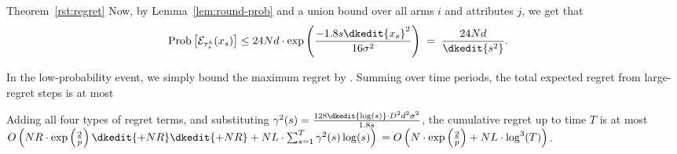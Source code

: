 \begin{emptyextraproof}{Theorem~\ref{rst:regret}}
Now, by Lemma~\ref{lem:round-prob} and a union bound over all arms $i$
and attributes $j$, we get that 
\begin{align*}
\Prob{\AccEU{\tau_s^k}{x_s}}
& \leq 24 \ARMNUM d \cdot \exp \left( \frac{-1.8 s \dkedit{x_s}^2}{16 \sigma^2} \right)
\; = \; \frac{24 \ARMNUM d}{\dkedit{s^2}}.
\end{align*}

In the low-probability event, we simply bound the maximum regret by \MAXR.
Summing over  time periods,
the total expected regret from large-regret steps is at most

Adding all four types of regret terms,
and substituting 
$\EarlyCut[2]{s} = \frac{128 \dkedit{\log(s)} \cdot \Diam^2 d^2 \sigma^2}{1.8 s}$,
the cumulative regret up to time $T$ is at most
$
O \left(\ARMNUM \MAXR \cdot \exp \left( \frac{2}{p} \right)
\dkedit{+ \ARMNUM \MAXR}
\dkedit{+ \ARMNUM \MAXR}
+ \ARMNUM \TieDensity \cdot \sum_{s=1}^{T} \EarlyCut[2]{s} \log(s) \right)\\
= 
O \left(\ARMNUM  \cdot \exp \left( \frac{2}{p} \right)
+ \ARMNUM \TieDensity \cdot \log^3(T) \right)$.\QED
\end{emptyextraproof}
